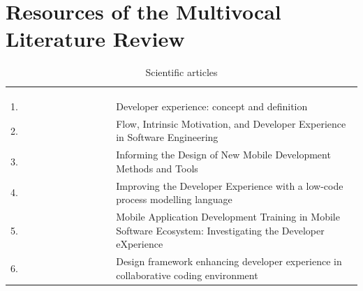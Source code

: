\documentclass[english, 12pt, a4paper, sci, utf8, a-1b, online]{aaltothesis}
\begin{document}
\section{Resources of the Multivocal Literature Review \label{mlr-resources}}

\renewcommand{\arraystretch}{1.5}

\begin{center}
  \begin{longtable}{p{0.05\linewidth}p{0.25\linewidth}p{0.7\linewidth}}
    \captionsetup{width=0.6\textwidth}                                                                                                                                                                    \\
    \caption{Scientific articles}                                                                                                                                                                         \\
    \label{table:scientific-articles}                                                                                                                                                                     \\
    1.  & \cite{fagerholm-dx-concept-and-definition}        & Developer experience: concept and definition                                                                                                \\
    2.  & \cite{flow-intrinsic-dx}                          & Flow, Intrinsic Motivation, and Developer Experience in Software Engineering                                                                \\
    3.  & \cite{nebeling2013informing}                      & Informing the Design of New Mobile Development Methods and Tools                                                                            \\
    4.  & \cite{henriques2018improving}                     & Improving the Developer Experience with a low-code process modelling language                                                               \\
    5.  & \cite{fontao2018mobile}                           & Mobile Application Development Training in Mobile Software Ecosystem: Investigating the Developer eXperience                                \\
    6.  & \cite{design-framework-enchancing}                & Design framework enhancing developer experience in collaborative coding environment                                                         \\

\end{longtable}
\end{center}
\end{document}
